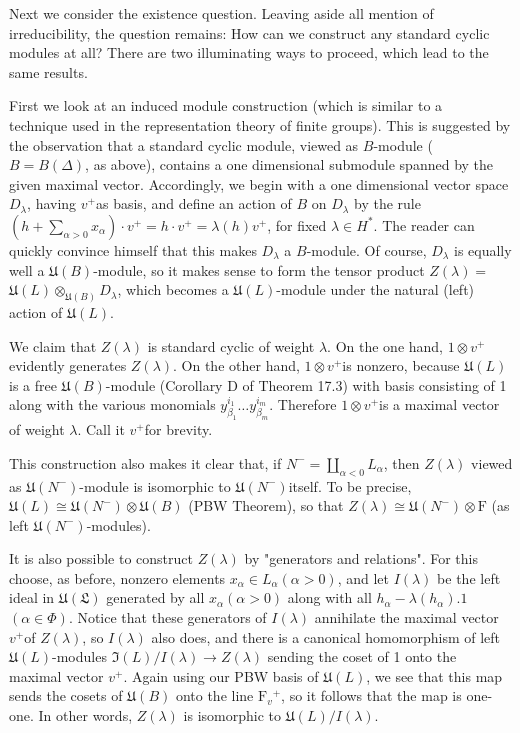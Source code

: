 \documentclass[10pt]{article}
\begin{document}
Next we consider the existence question. Leaving aside all mention of irreducibility, the question remains: How can we construct any standard cyclic modules at all? There are two illuminating ways to proceed, which lead to the same results.

First we look at an induced module construction (which is similar to a\\
technique used in the representation theory of finite groups). This is suggested by the observation that a standard cyclic module, viewed as $B$-module ( $B=B(\Delta)$, as above), contains a one dimensional submodule spanned by the given maximal vector. Accordingly, we begin with a one dimensional vector space $D_{\lambda}$, having $v^{+}$as basis, and define an action of $B$ on $D_{\lambda}$ by the rule $\left(h+\sum_{\alpha>0} x_{\alpha}\right) \cdot v^{+}=h \cdot v^{+}=\lambda(h) v^{+}$, for fixed $\lambda \in H^{*}$. The reader can quickly convince himself that this makes $D_{\lambda}$ a $B$-module. Of course, $D_{\lambda}$ is equally well a $\mathfrak{U}(B)$-module, so it makes sense to form the tensor product $Z(\lambda)=$ $\mathfrak{U}(L) \otimes_{\mathfrak{U}(B)} D_{\lambda}$, which becomes a $\mathfrak{U}(L)$-module under the natural (left) action of $\mathfrak{U}(L)$.

We claim that $Z(\lambda)$ is standard cyclic of weight $\lambda$. On the one hand, $1 \otimes v^{+}$evidently generates $Z(\lambda)$. On the other hand, $1 \otimes v^{+}$is nonzero, because $\mathfrak{U}(L)$ is a free $\mathfrak{U}(B)$-module (Corollary D of Theorem 17.3) with basis consisting of 1 along with the various monomials $y_{\beta_{1}}^{i_{1}} \ldots y_{\beta_{m}}^{i_{m}}$. Therefore $1 \otimes v^{+}$is a maximal vector of weight $\lambda$. Call it $v^{+}$for brevity.

This construction also makes it clear that, if $N^{-}=\coprod_{\alpha<0} L_{\alpha}$, then $Z(\lambda)$ viewed as $\mathfrak{U}\left(N^{-}\right)$-module is isomorphic to $\mathfrak{U}\left(N^{-}\right)$itself. To be precise, $\mathfrak{U}(L) \cong \mathfrak{U}\left(N^{-}\right) \otimes \mathfrak{U}(B)$ (PBW Theorem), so that $Z(\lambda) \cong \mathfrak{U}\left(N^{-}\right) \otimes \mathrm{F}$ (as left $\mathfrak{U}\left(N^{-}\right)$-modules).

It is also possible to construct $Z(\lambda)$ by "generators and relations". For this choose, as before, nonzero elements $x_{\alpha} \in L_{\alpha}(\alpha>0)$, and let $I(\lambda)$ be the left ideal in $\mathfrak{U ( L )}$ generated by all $x_{\alpha}(\alpha>0)$ along with all $h_{\alpha}-\lambda\left(h_{\alpha}\right) .1$ $(\alpha \in \Phi)$. Notice that these generators of $I(\lambda)$ annihilate the maximal vector $v^{+}$of $Z(\lambda)$, so $I(\lambda)$ also does, and there is a canonical homomorphism of left $\mathfrak{U}(L)$-modules $\mathfrak{I}(L) / I(\lambda) \rightarrow Z(\lambda)$ sending the coset of 1 onto the maximal vector $v^{+}$. Again using our PBW basis of $\mathfrak{U}(L)$, we see that this map sends the cosets of $\mathfrak{U}(B)$ onto the line $\mathrm{F}_{v}{ }^{+}$, so it follows that the map is one-one. In other words, $Z(\lambda)$ is isomorphic to $\mathfrak{U}(L) / I(\lambda)$.
\end{document}
